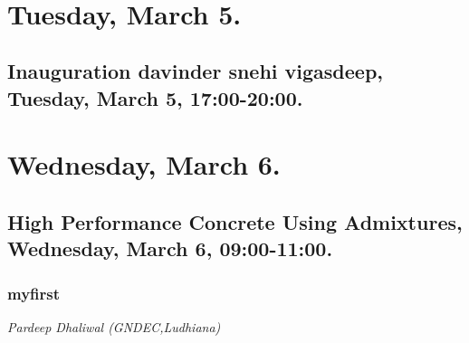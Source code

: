 
\hypertarget{listAbstracts}{~}


\chapter*{Tuesday, March 5.}



\section*{Inauguration davinder snehi vigasdeep, Tuesday, March 5, 17:00-20:00.}





\chapter*{Wednesday, March 6.}



\section*{High Performance Concrete Using Admixtures, Wednesday, March 6, 09:00-11:00.}


 


\label{1}

\subsection*{myfirst}
\textit{Pardeep Dhaliwal (GNDEC,Ludhiana)}

% 



